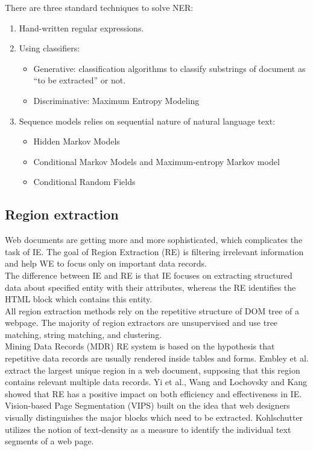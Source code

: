 There are three standard techniques to solve NER: 

\begin{enumerate}
    \item Hand-written regular expressions.
    \item Using classifiers:
    \begin{itemize}
        \item Generative: classification algorithms to classify substrings of document as “to be extracted” or not\cite{nerclass}.
        \item Discriminative: Maximum Entropy Modeling\cite{MaxEntropy}
    \end{itemize}
    \item Sequence models relies on sequential nature of natural language text:
    \begin{itemize}
        \item Hidden Markov Models\cite{HMM}
        \item Conditional Markov Models and Maximum-entropy Markov model\cite{CondModel}
        \item Conditional Random Fields\cite{ConditionalRF}
    \end{itemize}
\end{enumerate}


\subsection{Region extraction}
Web documents are getting more and more sophisticated, which complicates the task of IE. The goal of Region Extraction (RE) is filtering irrelevant information and help WE to focus only on important data records.\\

The difference between IE and RE is that IE focuses on extracting structured data about specified entity with their attributes, whereas the RE identifies the HTML block which contains this entity.\\

All region extraction methods rely on the repetitive structure of DOM tree of a webpage. The majority of region extractors are unsupervised and use tree matching, string matching, and clustering.\\

Mining Data Records (MDR) RE system\cite{LiuMinData} is based on the hypothesis that repetitive data records are usually rendered inside tables and forms. Embley et al.\cite{Embley} extract the largest unique region in a web document, supposing that this region contains relevant multiple data records. Yi et al.\cite{Noisy}, Wang and Lochovsky\cite{Wang} and Kang\cite{Kang} showed that RE has a positive impact on both efficiency and effectiveness in IE. Vision-based Page Segmentation (VIPS)\cite{Vips} built on the idea that web designers visually distinguishes the major blocks which need to be extracted. Kohlschutter\cite{Kohlschutter} utilizes the notion of text-density as a measure to identify the individual text segments of a web page.\\

